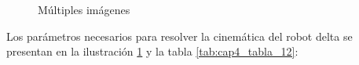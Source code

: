         
         \begin{figure}[htb]
             \centering
             \caption{Múltiples imágenes}
             \label{f:Cap4_Metodo_B_Modelacion_Cinematica_Posicion_2}
        \end{figure}
        
        
        Los parámetros necesarios para resolver la cinemática del robot delta se presentan en la ilustración \ref{f:Cap4_Metodo_B_Modelacion_Cinematica_Posicion_2} y la  tabla \ref{tab:cap4_tabla_12}:
        
